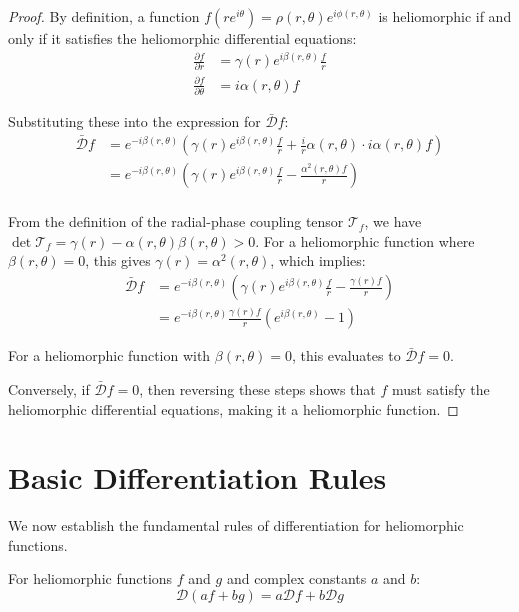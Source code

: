 \begin{proof}
By definition, a function $f(re^{i\theta}) = \rho(r,\theta)e^{i\phi(r,\theta)}$ is heliomorphic if and only if it satisfies the heliomorphic differential equations:
\begin{align}
\frac{\partial f}{\partial r} &= \gamma(r)e^{i\beta(r,\theta)}\frac{f}{r}\\
\frac{\partial f}{\partial \theta} &= i\alpha(r,\theta)f
\end{align}

Substituting these into the expression for $\bar{\mathcal{D}}f$:
\begin{align}
\bar{\mathcal{D}}f &= e^{-i\beta(r,\theta)}\left(\gamma(r)e^{i\beta(r,\theta)}\frac{f}{r} + \frac{i}{r}\alpha(r,\theta) \cdot i\alpha(r,\theta)f\right)\\
&= e^{-i\beta(r,\theta)}\left(\gamma(r)e^{i\beta(r,\theta)}\frac{f}{r} - \frac{\alpha^2(r,\theta)f}{r}\right)\\
\end{align}

From the definition of the radial-phase coupling tensor $\mathcal{T}_f$, we have $\det\mathcal{T}_f = \gamma(r) - \alpha(r,\theta)\beta(r,\theta) > 0$. For a heliomorphic function where $\beta(r,\theta) = 0$, this gives $\gamma(r) = \alpha^2(r,\theta)$, which implies:
\begin{align}
\bar{\mathcal{D}}f &= e^{-i\beta(r,\theta)}\left(\gamma(r)e^{i\beta(r,\theta)}\frac{f}{r} - \frac{\gamma(r)f}{r}\right)\\
&= e^{-i\beta(r,\theta)}\frac{\gamma(r)f}{r}\left(e^{i\beta(r,\theta)} - 1\right)
\end{align}

For a heliomorphic function with $\beta(r,\theta) = 0$, this evaluates to $\bar{\mathcal{D}}f = 0$.

Conversely, if $\bar{\mathcal{D}}f = 0$, then reversing these steps shows that $f$ must satisfy the heliomorphic differential equations, making it a heliomorphic function.
\end{proof}

\section{Basic Differentiation Rules}

We now establish the fundamental rules of differentiation for heliomorphic functions.

\begin{theorem}
For heliomorphic functions $f$ and $g$ and complex constants $a$ and $b$:
\begin{equation}
\mathcal{D}(af + bg) = a\mathcal{D}f + b\mathcal{D}g
\end{equation}
\end{theorem}

